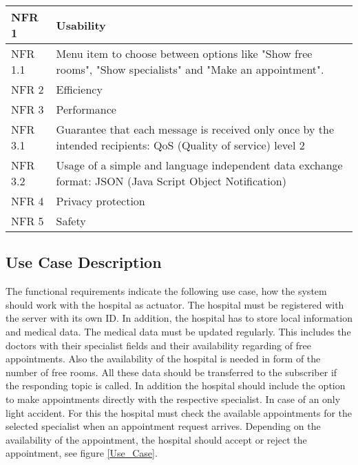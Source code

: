 \begin{table}
\begin{tabular}{|l|l|}
NFR 1 & Usability                                                                                                     
\\ 
\hline
\rowcolor[rgb]{0.894,0.894,0.894} 
NFR 1.1  & Menu item to choose between options like "Show free rooms", "Show specialists" and "Make an appointment".     
\\ 
\hline
NFR 2  & Efficiency                                                                                                    
\\ 
\hline
\rowcolor[rgb]{0.894,0.894,0.894} 
NFR 3 & Performance                                                                                                   
\\ 
\hline
NFR 3.1 & Guarantee that each message is received only once by the intended recipients: QoS (Quality of service) level 2                                                                                        
\\
\hline
\rowcolor[rgb]{0.894,0.894,0.894} 
NFR 3.2 & Usage of a simple and language independent data exchange format: JSON (Java Script Object Notification)                                                                                         
\\
\hline
NFR 4  & Privacy protection                                                                                             
\\ 
\hline
\rowcolor[rgb]{0.894,0.894,0.894} 
NFR 5  & Safety                                                                                                        
\\
\bottomrule
\end{tabular}
\end{table}
\newpage
\subsection{Use Case Description}
The functional requirements indicate the following use case, how the system should work with the hospital as actuator.
The hospital must be registered with the server with its own ID. In addition, the hospital has to store local information and medical data. The medical data must be updated regularly. This includes the doctors with their specialist fields and their availability regarding of free appointments. Also the availability of the hospital is needed in form of the number of free rooms. All these data should be transferred to the subscriber if the responding topic is called.
In addition the hospital should include the option to make appointments directly with the respective specialist. In case of an only light accident. For this the hospital must check the available appointments for the selected specialist when an appointment request arrives.
Depending on the availability of the appointment, the hospital should accept or reject the appointment, see figure \ref{Use_Case}.
\\

